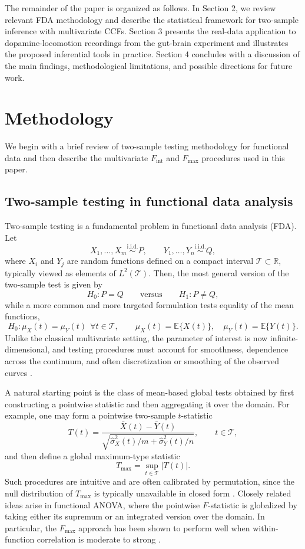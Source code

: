 \documentclass[12pt]{article}
\begin{document}
The remainder of the paper is organized as follows. In Section 2, we review relevant FDA methodology and describe the statistical framework for two-sample inference with multivariate CCFs. Section 3 presents the real-data application to dopamine-locomotion recordings from the gut-brain experiment and illustrates the proposed inferential tools in practice. Section 4 concludes with a discussion of the main findings, methodological limitations, and possible directions for future work.


\section{Methodology}

We begin with a brief review of two-sample testing methodology for functional data and then describe the multivariate \(F_{\mathrm{int}}\) and \(F_{\max}\) procedures used in this paper.

\subsection{Two-sample testing in functional data analysis}

Two-sample testing is a fundamental problem in functional data analysis (FDA). Let
\[
X_1,\ldots,X_m \stackrel{\mathrm{i.i.d.}}{\sim} P,
\qquad
Y_1,\ldots,Y_n \stackrel{\mathrm{i.i.d.}}{\sim} Q,
\]
where \(X_i\) and \(Y_j\) are random functions defined on a compact interval \(\mathcal T \subset \mathbb R\), typically viewed as elements of \(L^2(\mathcal T)\). 
Then, the most general version of the two-sample test is given by
\[
H_0: P = Q
\qquad \text{versus} \qquad
H_1: P \neq Q,
\]
while a more common and more targeted formulation tests equality of the mean functions,
\[
H_0: \mu_X(t) = \mu_Y(t)\ \ \forall t \in \mathcal T,
\qquad
\mu_X(t) = \mathbb E\{X(t)\},\quad \mu_Y(t) = \mathbb E\{Y(t)\}.
\]
Unlike the classical multivariate setting, the parameter of interest is now infinite-dimensional, and testing procedures must account for smoothness, dependence across the continuum, and often discretization or smoothing of the observed curves \citep{ramsay2005fda,ramsay2009fda,kokoszka2017introduction}. 

A natural starting point is the class of mean-based global tests obtained by first constructing a pointwise statistic and then aggregating it over the domain. For example, one may form a pointwise two-sample \(t\)-statistic
\[
T(t) =
\frac{\bar X(t)-\bar Y(t)}
{\sqrt{\hat\sigma_X^2(t)/m+\hat\sigma_Y^2(t)/n}},
\qquad t\in\mathcal T,
\]
and then define a global maximum-type statistic
\[
T_{\max}=\sup_{t\in\mathcal T}|T(t)|.
\]
Such procedures are intuitive and are often calibrated by permutation, since the null distribution of \(T_{\max}\) is typically unavailable in closed form \citep{ramsay2009fda,kokoszka2017introduction}. Closely related ideas arise in functional ANOVA, where the pointwise \(F\)-statistic is globalized by taking either its supremum or an integrated version over the domain. In particular, the \(F_{\max}\) approach has been shown to perform well when within-function correlation is moderate to strong \citep{zhang2019fmax}. 
\end{document}
